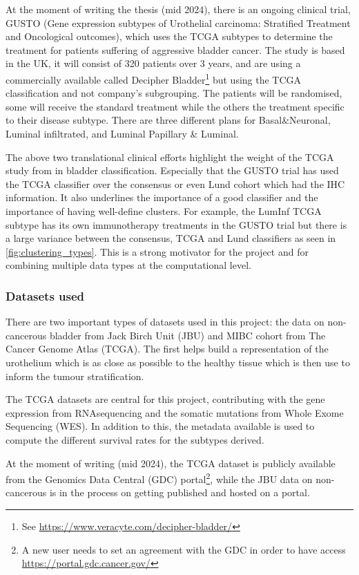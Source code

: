 At the moment of writing the thesis (mid 2024), there is an ongoing clinical trial, GUSTO (Gene expression subtypes of Urothelial carcinoma: Stratified Treatment and Oncological outcomes), which uses the TCGA subtypes to determine the treatment for patients suffering of aggressive bladder cancer. The study is based in the UK, it will consist of 320 patients over 3 years, and are using a commercially available called Decipher Bladder\footnote{See \url{https://www.veracyte.com/decipher-bladder/}} but using the TCGA classification and not company's subgrouping\cite{Griffin2024-zr}. The patients will be randomised, some will receive the standard treatment while the others the treatment specific to their disease subtype. There are three different plans for Basal\&Neuronal, Luminal infiltrated, and Luminal Papillary \& Luminal.

The above two translational clinical efforts highlight the weight of the TCGA study from \citet{Robertson2017-mg} in bladder classification. Especially that the GUSTO trial has used the TCGA classifier over the consensus or even Lund cohort which had the IHC information. It also underlines the importance of a good classifier and the importance of having well-define clusters. For example, the LumInf TCGA subtype has its own immunotherapy treatments in the GUSTO trial \citet{Griffin2024-zr} but there is a large variance between the consensus, TCGA and Lund classifiers as seen in \cref{fig:clustering_types}. This is a strong motivator for the project and for combining multiple data types at the computational level.


\subsubsection{Datasets used}

There are two important types of datasets used in this project: the data on non-cancerous bladder from Jack Birch Unit (JBU) and MIBC cohort from The Cancer Genome Atlas (TCGA). The first helps build a representation of the urothelium which is as close as possible to the healthy tissue which is then use to inform the tumour stratification.

The TCGA datasets are central for this project, contributing with the gene expression from RNAsequencing and the somatic mutations from Whole Exome Sequencing (WES). In addition to this, the metadata available is used to compute the different survival rates for the subtypes derived. 

At the moment of writing (mid 2024), the TCGA dataset is publicly available from the Genomics Data Central (GDC) portal\footnote{A new user needs to set an agreement with the GDC in order to have access \url{https://portal.gdc.cancer.gov/}}, while the JBU data on non-cancerous is in the process on getting published and hosted on a portal.

